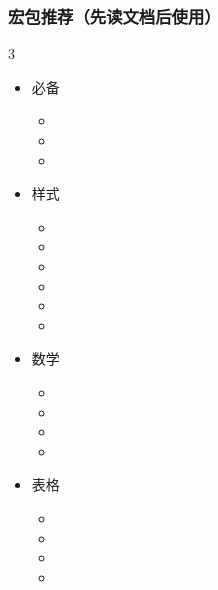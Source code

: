     \begin{frame}[fragile]
      \frametitle{宏包推荐（\textbf{先读文档}后使用）}
      \setlength{\leftmarginii}{1.5em}
      \vspace{-1.5em}
      \begin{multicols}{3}
        \begin{itemize}
          \item 必备
    
            \begin{itemize}
              \item {}
              \item {}
              \item {}
            \end{itemize}
    
          \item 样式
    
            \begin{itemize}
              \item {}
              \item {}
              \item {}
              \item {}
              \item {}
              \item {}
            \end{itemize}
    
          \item 数学
    
            \begin{itemize}
              \item {}
              \item {}
              \item {}
              \item {}
            \end{itemize}
    
          \item 表格
    
            \begin{itemize}
              \item {}
              \item {}
              \item {}
              \item {}
            \end{itemize}
    

\end{itemize}
\end{multicols}
\end{frame}
